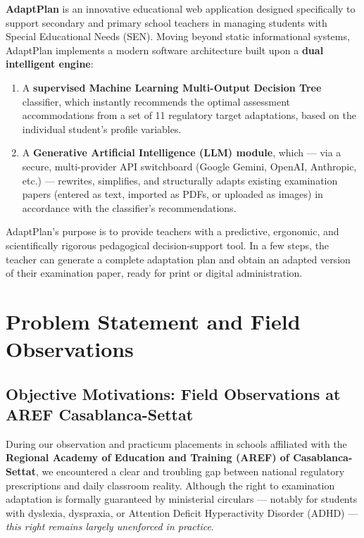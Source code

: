 \documentclass[12pt,a4paper]{report}
\begin{document}
\textbf{AdaptPlan} is an innovative educational web application designed specifically to support secondary and primary school teachers in managing students with Special Educational Needs (SEN). Moving beyond static informational systems, AdaptPlan implements a modern software architecture built upon a \textbf{dual intelligent engine}:

\begin{enumerate}[leftmargin=*, label=\arabic*.]
  \item A \textbf{supervised Machine Learning Multi-Output Decision Tree} classifier, which instantly recommends the optimal assessment accommodations from a set of 11 regulatory target adaptations, based on the individual student's profile variables.
  \item A \textbf{Generative Artificial Intelligence (LLM) module}, which — via a secure, multi-provider API switchboard (Google Gemini, OpenAI, Anthropic, etc.) — rewrites, simplifies, and structurally adapts existing examination papers (entered as text, imported as PDFs, or uploaded as images) in accordance with the classifier's recommendations.
\end{enumerate}

AdaptPlan's purpose is to provide teachers with a predictive, ergonomic, and scientifically rigorous pedagogical decision-support tool. In a few steps, the teacher can generate a complete adaptation plan and obtain an adapted version of their examination paper, ready for print or digital administration.

\section{Problem Statement and Field Observations}

\subsection{Objective Motivations: Field Observations at AREF Casablanca-Settat}

During our observation and practicum placements in schools affiliated with the \textbf{Regional Academy of Education and Training (AREF) of Casablanca-Settat}, we encountered a clear and troubling gap between national regulatory prescriptions and daily classroom reality. Although the right to examination adaptation is formally guaranteed by ministerial circulars — notably for students with dyslexia, dyspraxia, or Attention Deficit Hyperactivity Disorder (ADHD) — \textit{this right remains largely unenforced in practice}.
\end{document}
